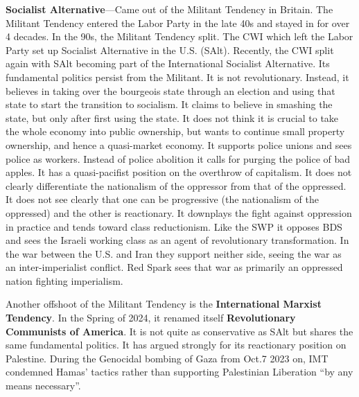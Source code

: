 \textbf{Socialist Alternative}---Came out of the Militant Tendency in Britain. The Militant Tendency entered the Labor Party in the late 40s and stayed in for over 4 decades. In the 90s, the Militant Tendency split. The CWI which left the Labor Party set up Socialist Alternative in the U.S. (SAlt). Recently, the CWI split again with SAlt becoming part of the International Socialist Alternative. Its fundamental politics persist from the Militant. It is not revolutionary. Instead, it believes in taking over the bourgeois state through an election and using that state to start the transition to socialism. It claims to believe in smashing the state, but only after first using the state. It does not think it is crucial to take the whole economy into public ownership, but wants to continue small property ownership, and hence a quasi-market economy. It supports police unions and sees police as workers. Instead of police abolition it calls for purging the police of bad apples. It has a quasi-pacifist position on the overthrow of capitalism. It does not clearly differentiate the nationalism of the oppressor from that of the oppressed. It does not see clearly that one can be progressive (the nationalism of the oppressed) and the other is reactionary. It downplays the fight against oppression in practice and tends toward class reductionism. Like the SWP it opposes BDS and sees the Israeli working class as an agent of revolutionary transformation. In the war between the U.S. and Iran they support neither side, seeing the war as an inter-imperialist conflict. Red Spark sees that war as primarily an oppressed nation fighting imperialism.

Another offshoot of the Militant Tendency is the \textbf{International Marxist Tendency}. In the Spring of 2024, it renamed itself \textbf{Revolutionary Communists of America}. It is not quite as conservative as SAlt but shares the same fundamental politics. It has argued strongly for its reactionary position on Palestine. During the Genocidal bombing of Gaza from Oct.7 2023 on, IMT condemned Hamas' tactics rather than supporting Palestinian Liberation ``by any means necessary''.

